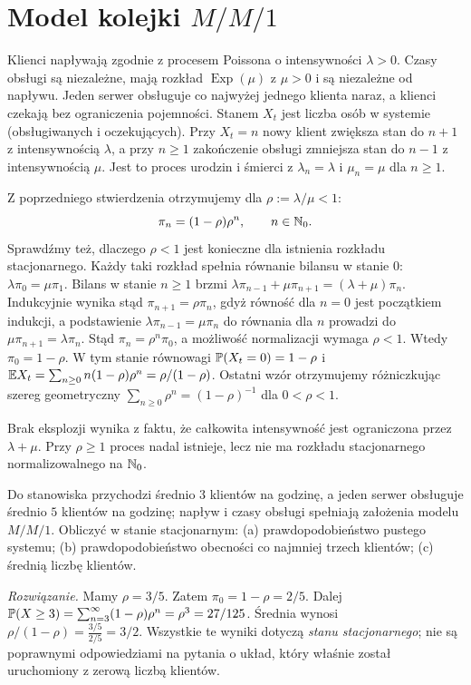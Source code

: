 \section{Model kolejki \texorpdfstring{$M/M/1$}{M/M/1}}
\begin{przyklad}
Klienci napływają zgodnie z procesem Poissona o intensywności
$\lambda>0$. Czasy obsługi są niezależne, mają rozkład
$\operatorname{Exp}(\mu)$ z $\mu>0$ i są niezależne
od napływu. Jeden serwer obsługuje co najwyżej jednego klienta
naraz, a klienci czekają bez ograniczenia pojemności.
Stanem $X_t$ jest liczba osób w systemie (obsługiwanych
i oczekujących). Przy $X_t=n$ nowy klient zwiększa stan do
$n+1$ z intensywnością $\lambda$, a przy $n\ge1$
zakończenie obsługi zmniejsza stan do $n-1$ z intensywnością
$\mu$. Jest to proces urodzin i śmierci z
$\lambda_n=\lambda$ i $\mu_n=\mu$ dla $n\ge1$.

Z poprzedniego stwierdzenia otrzymujemy dla
$\rho:=\lambda/\mu<1$:
\[
\pi_n=(1-\rho)\rho^n,\qquad n\in\mathbb{N}_0.
\]
Sprawdźmy też, dlaczego $\rho<1$ jest konieczne dla
istnienia rozkładu stacjonarnego. Każdy taki rozkład
spełnia równanie bilansu w stanie $0$:
$\lambda\pi_0=\mu\pi_1$.
Bilans w stanie $n\ge1$ brzmi
$\lambda\pi_{n-1}+\mu\pi_{n+1}=(\lambda+\mu)\pi_n$.
Indukcyjnie wynika stąd $\pi_{n+1}=\rho\pi_n$, gdyż
równość dla $n=0$ jest początkiem indukcji, a podstawienie
$\lambda\pi_{n-1}=\mu\pi_n$ do równania dla $n$
prowadzi do $\mu\pi_{n+1}=\lambda\pi_n$.
Stąd $\pi_n=\rho^n\pi_0$, a możliwość normalizacji wymaga
$\rho<1$. Wtedy $\pi_0=1-\rho$.
W tym stanie równowagi
$\mathbb{P}(X_t=0)=1-\rho$ i
$\mathbb{E} X_t=\sum_{n\ge0}n(1-\rho)\rho^n=\rho/(1-\rho)$.
Ostatni wzór otrzymujemy różniczkując szereg geometryczny
$\sum_{n\ge0}\rho^n=(1-\rho)^{-1}$ dla $0<\rho<1$.

Brak eksplozji wynika z faktu, że całkowita intensywność
jest ograniczona przez $\lambda+\mu$. Przy $\rho\ge1$
proces nadal istnieje, lecz nie ma rozkładu stacjonarnego
normalizowalnego na $\mathbb{N}_0$.
\end{przyklad}

\begin{zadanie}
Do stanowiska przychodzi średnio $3$ klientów na godzinę,
a jeden serwer obsługuje średnio $5$ klientów na godzinę;
napływ i czasy obsługi spełniają założenia modelu $M/M/1$.
Obliczyć w stanie stacjonarnym: (a) prawdopodobieństwo
pustego systemu; (b) prawdopodobieństwo obecności co
najmniej trzech klientów; (c) średnią liczbę klientów.

\emph{Rozwiązanie.} Mamy $\rho=3/5$. Zatem
$\pi_0=1-\rho=2/5$.
Dalej
$\mathbb{P}(X\ge3)=\sum_{n=3}^\infty(1-\rho)\rho^n
=\rho^3=27/125$.
Średnia wynosi $\rho/(1-\rho)=\frac{3/5}{2/5}=3/2$.
Wszystkie te wyniki dotyczą \emph{stanu stacjonarnego};
nie są poprawnymi odpowiedziami na pytania o układ,
który właśnie został uruchomiony z zerową liczbą klientów.
\end{zadanie}

